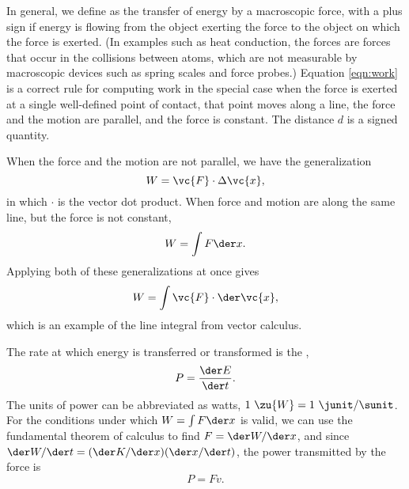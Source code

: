In general, we define  as the transfer of energy by a macroscopic force, with a plus sign if energy
is flowing from the object exerting the force to the object on which the force is exerted.
(In examples such as heat conduction, the forces are forces that occur in the collisions between atoms,
which are not measurable by macroscopic devices such as spring scales and force probes.)
Equation \eqref{eqn:work} is a correct rule for computing work in the special case when the force is
exerted at a single well-defined point of contact, that point moves along a line, the force and the
motion are parallel, and the force is constant. The distance $d$ is a signed quantity.

When the force and the motion are not parallel, we have the generalization
\begin{equation}
  W = \vc{F}\cdot\Delta \vc{x},
\end{equation}
in which $\cdot$ is the vector dot product. When force and motion are along the same line,
but the force is not constant,
\begin{equation}
  W = \int F \der x.
\end{equation}
Applying both of these generalizations at once gives
\begin{equation}
  W = \int \vc{F} \cdot \der \vc{x},
\end{equation}
which is an example of the line integral from vector calculus.

The rate at which energy is transferred or transformed is the ,
\begin{equation}
  P = \frac{\der E}{\der t}.
\end{equation}
The units of power can be abbreviated as watts, $1\ \zu{W}=1\ \junit/\sunit$.
For the conditions under which $W = \int F \der x$ is valid, we can use the
fundamental theorem of calculus to find $F=\der W/\der x$, and since
$\der W/\der t=(\der K/\der x)(\der x/\der t)$, the power transmitted by the
force is
\begin{equation}
  P = Fv.
\end{equation}
